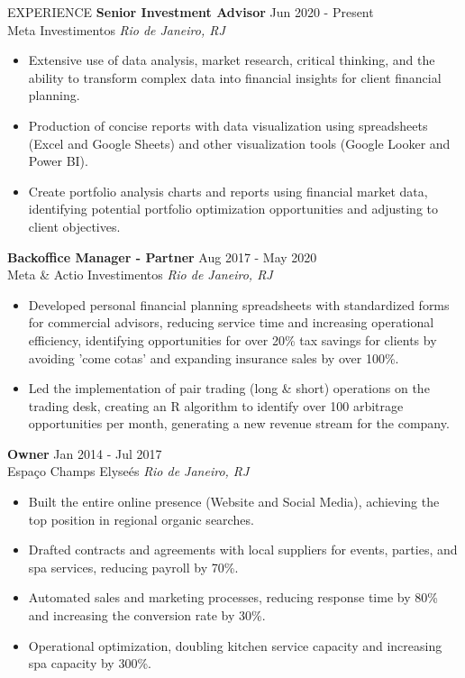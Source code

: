 \documentclass{resume}
\begin{document}
\vspace{-1em}
\begin{rSection}{EXPERIENCE}
\textbf{Senior Investment Advisor} \hfill Jun 2020 - Present\\
Meta Investimentos \hfill \textit{Rio de Janeiro, RJ}
{\footnotesize
\begin{itemize}
    \itemsep -3pt {} 
     \item Extensive use of data analysis, market research, critical thinking, and the ability to transform complex data into financial insights for client financial planning.
     \item Production of concise reports with data visualization using spreadsheets (Excel and Google Sheets) and other visualization tools (Google Looker and Power BI).
     \item Create portfolio analysis charts and reports using financial market data, identifying potential portfolio optimization opportunities and adjusting to client objectives.
 \end{itemize}
}
\textbf{Backoffice Manager - Partner} \hfill Aug 2017 - May 2020\\
Meta \& Actio Investimentos \hfill \textit{Rio de Janeiro, RJ}
{\footnotesize
\begin{itemize}
    \itemsep -3pt {} 
    \item Developed personal financial planning spreadsheets with standardized forms for commercial advisors, reducing service time and increasing operational efficiency, identifying opportunities for over 20\% tax savings for clients by avoiding 'come cotas' and expanding insurance sales by over 100\%.
    \item Led the implementation of pair trading (long \& short) operations on the trading desk, creating an R algorithm to identify over 100 arbitrage opportunities per month, generating a new revenue stream for the company.
\end{itemize}
}
\textbf{Owner} \hfill Jan 2014 - Jul 2017\\
Espaço Champs Elyseés \hfill \textit{Rio de Janeiro, RJ}
{\footnotesize
\begin{itemize}
    \itemsep -3pt {} 
    \item Built the entire online presence (Website and Social Media), achieving the top position in regional organic searches.
    \item Drafted contracts and agreements with local suppliers for events, parties, and spa services, reducing payroll by 70\%.
    \item Automated sales and marketing processes, reducing response time by 80\% and increasing the conversion rate by 30\%.
    \item Operational optimization, doubling kitchen service capacity and increasing spa capacity by 300\%.
\end{itemize}
}
\end{rSection} 
\end{document}
